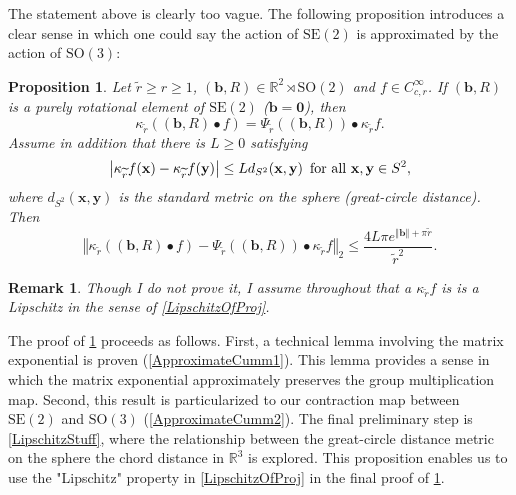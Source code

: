 \documentclass[a4paper,11pt]{scrartcl}
\newcounter{dummy}
\numberwithin{dummy}{section}
\theoremstyle{plain}
\newtheorem{proposition}[dummy]{Proposition}
\theoremstyle{plain}
\newtheorem{remark}[dummy]{Remark}
\theoremstyle{plain}
\theoremstyle{plain}
\theoremstyle{nonumberplain}
\newcommand{\F}[1][R]{\mathbb{#1}} %
\newcommand{\Ltwonorm}[1]{\left\Vert #1 \right\Vert} %
\newcommand{\SE}{\mathrm{SE}}
\newcommand{\SO}{\mathrm{SO}}
\begin{document}
	The statement above is clearly too vague. The following proposition introduces a clear sense in which one could say the action of $ \SE(2) $ is approximated by the action of $ \SO(3) $:
	\begin{proposition}
		\label{GroupActionApprox}
		Let $ \widetilde{r} \ge r \ge 1 $, $ (\mathbf{b}, R) \in \F^{2} \rtimes \SO(2) $ and $ f \in C_{c, r}^{\infty} $.
		If $ (\mathbf{b}, R) $ is a purely rotational element of $ \SE(2) $ ($ \mathbf{b} = \mathbf{0} $), then 
		\begin{equation}
		\label{CummResult2}
		\kappa_{\widetilde{r}} \left( (\mathbf{b}, R) \bullet f \right)
		= \Psi_{\widetilde{r}} ((\mathbf{b}, R)) \bullet \kappa_{\widetilde{r}} f.
		\end{equation}
		Assume in addition that there is $ L \ge 0 $ satisfying
		\begin{equation}
		\label{LipschitzOfProj}
		\left| \kappa_{\widetilde{r}} f(\mathbf{x}) - \kappa_{\widetilde{r}} f(\mathbf{y}) \right| \le L d_{S^{2}} ( \mathbf{x}, \mathbf{y} )
		\enskip \mbox{for all } \mathbf{x}, \mathbf{y} \in S^{2},
		\end{equation}
		where $ d_{S^{2}} (\mathbf{x}, \mathbf{y}) $ is the standard metric on the sphere (great-circle distance). Then 
		\begin{equation}
			\label{CummResult1}
			\Ltwonorm{\kappa_{\widetilde{r}} \left( (\mathbf{b}, R) \bullet f \right) - \Psi_{\widetilde{r}} ((\mathbf{b}, R)) \bullet \kappa_{\widetilde{r}} f }_{2}
			\le \frac{4 L \pi e^{\Ltwonorm{\mathbf{b}} + \pi \widetilde{r}}}{\widetilde{r}^{2}}.
		\end{equation}
	\end{proposition}
	
	\begin{remark}
		Though I do not prove it, I assume throughout that a $ \kappa_{\widetilde{r}} f $ is is a Lipschitz in the sense of \eqref{LipschitzOfProj}.
	\end{remark}
	
	The proof of \cref{GroupActionApprox} proceeds as follows. First, a technical lemma involving the matrix exponential is proven (\cref{ApproximateCumm1}). This lemma provides a sense in which the matrix exponential approximately preserves the group multiplication map. Second, this result is particularized to our contraction map between $ \SE(2) $ and $ \SO(3) $ (\cref{ApproximateCumm2}). The final preliminary step is \cref{LipschitzStuff}, where the relationship between the great-circle distance metric on the sphere the chord distance in $ \F^{3} $ is explored. This proposition enables us to use the "Lipschitz" property in \eqref{LipschitzOfProj} in the final proof of \cref{GroupActionApprox}.
	
\end{document}
